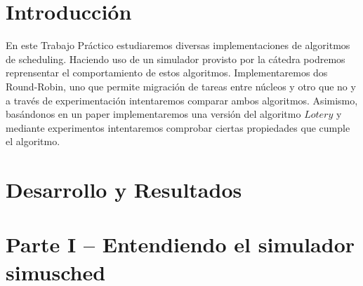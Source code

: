\documentclass[a4paper,10pt,twoside]{article}
\begin{document}
\newpage




\tableofcontents

\newpage




\section{Introducción}

\indent \indent En este Trabajo Práctico estudiaremos diversas implementaciones de algoritmos de scheduling. 
Haciendo uso de un simulador provisto por la cátedra podremos reprensentar el comportamiento de estos algoritmos. 
Implementaremos dos Round-Robin, uno que permite migración de tareas entre núcleos y otro que no y a través de experimentación intentaremos comparar ambos algoritmos. 
Asimismo, basándonos en un paper implementaremos una versión del algoritmo $Lotery$ y 
mediante experimentos intentaremos comprobar ciertas propiedades que cumple el algoritmo.\\


\newpage
\section{Desarrollo y Resultados}

\section{Parte I – Entendiendo el simulador simusched}


\newpage
\end{document}
